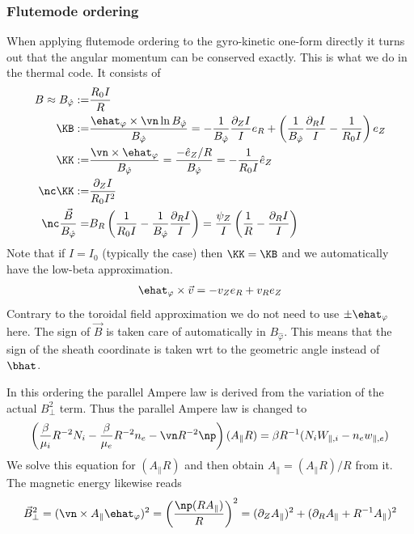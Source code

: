 \subsubsection{Flutemode ordering} \label{sec:flutemode}
When applying flutemode ordering to the gyro-kinetic one-form directly it turns
out that the angular momentum can be conserved exactly. This is what we do in the thermal code.
It consists of
\begin{align}
    B \approx B_{\hat \varphi}:=& \frac{R_0 I}{R}
    \\
    \KB :=& \frac{\ehat_\varphi \times \vn \ln B_{\hat \varphi}}{B_{\hat \varphi}}= - \frac{1}{B_{\hat \varphi}}\frac{ \partial_Z I}{I} e_R + \left(\frac{1}{B_{\hat \varphi}}\frac{\partial_R I}{I} - \frac{1}{R_0 I}\right) e_Z
    \\
    \KK :=& \frac{\vn \times \ehat_\varphi}{B_{\hat \varphi}} = \frac{-\hat e_Z/R}{B_{\hat \varphi}} = - \frac{1}{R_0 I} \hat e_Z
    \\
    \nc \KK :=& \frac{\partial_Z I}{R_0 I^2}
    \\
    \nc \frac{\vec B}{B_{\hat \varphi}} =& B_R\left(  \frac{1}{R_0 I} - \frac{1}{B_{\hat \varphi}}\frac{\partial_R I}{I}\right) = \frac{\psi_Z}{I} \left( \frac{1}{R} -  \frac{\partial_R I}{I} \right)
\end{align}
Note that if $I=I_0$ (typically the case) then $\KK = \KB$ and we automatically have the low-beta approximation.
\begin{align}
    \ehat_\varphi \times \vec v = -v_Ze_R +v_Re_Z
\end{align}
Contrary to the toroidal field approximation we do not need to use $\pm \ehat_\varphi$ here. The sign of $\vec B$ is taken care of automatically in $B_{\hat \varphi}$.
This means that the sign of the sheath coordinate is taken wrt to the geometric angle instead of $\bhat$.

In this ordering the parallel Ampere law is derived from the variation of the actual $B_\perp^2$ term.
Thus the parallel Ampere law is changed to
\begin{align}
    \left(\frac{\beta}{\mu_i}R^{-2}N_i - \frac{\beta}{\mu_e} R^{-2}n_e - \vn R^{-2} \np \right) (A_\parallel R)= \beta R^{-1}(N_i W_{\parallel,i} - n_e w_{\parallel,e})
\end{align}
We solve this equation for $(A_\parallel R)$ and then obtain $A_\parallel = (A_\parallel R)/R$ from it.
The magnetic energy likewise reads
\begin{align}
\vec B_\perp^2 = (\vn \times A_\parallel \ehat_\varphi)^2 = \left( \frac{\np (R A_\parallel)}{R}\right)^2 = (\partial_Z A_\parallel)^2 + ( \partial_R A_\parallel + R^{-1} A_\parallel)^2
\end{align}
